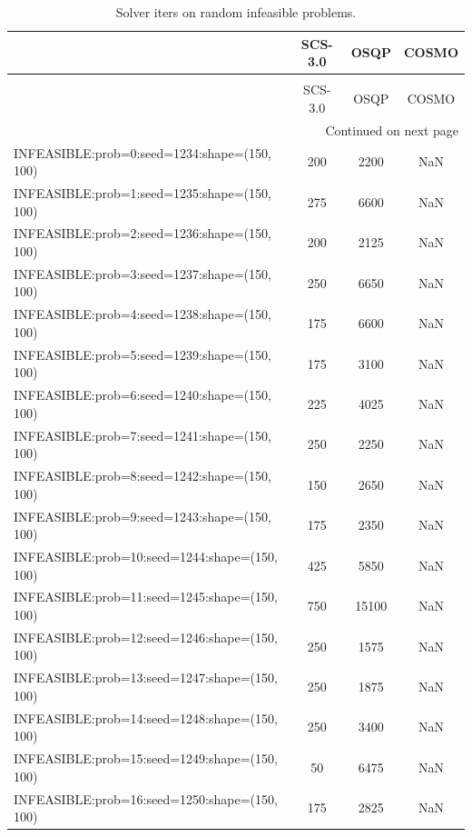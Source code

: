 \begin{longtable}{lccc}
\caption{Solver iters on random infeasible problems.}
\label{t-random infeasible-iters}\\
\toprule
{} &  SCS-3.0 &  OSQP &  COSMO \\
\midrule
\endfirsthead
\caption[]{Solver iters on random infeasible problems.} \\
\toprule
{} &  SCS-3.0 &  OSQP &  COSMO \\
\midrule
\endhead
\midrule
\multicolumn{4}{r}{{Continued on next page}} \\
\midrule
\endfoot

\bottomrule
\endlastfoot
INFEASIBLE:prob=0:seed=1234:shape=(150, 100)   &      200 &  2200 &    NaN \\
INFEASIBLE:prob=1:seed=1235:shape=(150, 100)   &      275 &  6600 &    NaN \\
INFEASIBLE:prob=2:seed=1236:shape=(150, 100)   &      200 &  2125 &    NaN \\
INFEASIBLE:prob=3:seed=1237:shape=(150, 100)   &      250 &  6650 &    NaN \\
INFEASIBLE:prob=4:seed=1238:shape=(150, 100)   &      175 &  6600 &    NaN \\
INFEASIBLE:prob=5:seed=1239:shape=(150, 100)   &      175 &  3100 &    NaN \\
INFEASIBLE:prob=6:seed=1240:shape=(150, 100)   &      225 &  4025 &    NaN \\
INFEASIBLE:prob=7:seed=1241:shape=(150, 100)   &      250 &  2250 &    NaN \\
INFEASIBLE:prob=8:seed=1242:shape=(150, 100)   &      150 &  2650 &    NaN \\
INFEASIBLE:prob=9:seed=1243:shape=(150, 100)   &      175 &  2350 &    NaN \\
INFEASIBLE:prob=10:seed=1244:shape=(150, 100)  &      425 &  5850 &    NaN \\
INFEASIBLE:prob=11:seed=1245:shape=(150, 100)  &      750 & 15100 &    NaN \\
INFEASIBLE:prob=12:seed=1246:shape=(150, 100)  &      250 &  1575 &    NaN \\
INFEASIBLE:prob=13:seed=1247:shape=(150, 100)  &      250 &  1875 &    NaN \\
INFEASIBLE:prob=14:seed=1248:shape=(150, 100)  &      250 &  3400 &    NaN \\
INFEASIBLE:prob=15:seed=1249:shape=(150, 100)  &       50 &  6475 &    NaN \\
INFEASIBLE:prob=16:seed=1250:shape=(150, 100)  &      175 &  2825 &    NaN \\

\end{longtable}
